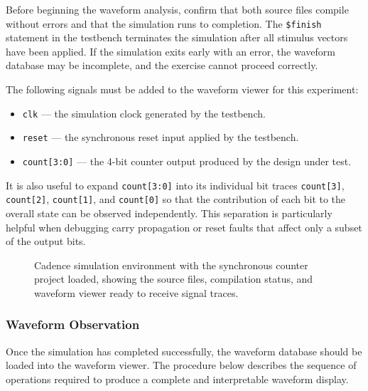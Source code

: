 Before beginning the waveform analysis, confirm that both source files compile
without errors and that the simulation runs to completion. The \texttt{\$finish}
statement in the testbench terminates the simulation after all stimulus vectors
have been applied. If the simulation exits early with an error, the waveform
database may be incomplete, and the exercise cannot proceed correctly.

The following signals must be added to the waveform viewer for this experiment:

\begin{itemize}
    \item \texttt{clk} — the simulation clock generated by the testbench.
    \item \texttt{reset} — the synchronous reset input applied by the testbench.
    \item \texttt{count[3:0]} — the 4-bit counter output produced by the design
          under test.
\end{itemize}

It is also useful to expand \texttt{count[3:0]} into its individual bit traces
\texttt{count[3]}, \texttt{count[2]}, \texttt{count[1]}, and \texttt{count[0]}
so that the contribution of each bit to the overall state can be observed
independently. This separation is particularly helpful when debugging carry
propagation or reset faults that affect only a subset of the output bits.

\begin{figure}[h]
\centering
\caption{Cadence simulation environment with the synchronous counter project
         loaded, showing the source files, compilation status, and waveform
         viewer ready to receive signal traces.}
\label{fig:sim-env}
\end{figure}

\subsubsection{Waveform Observation}
\label{sec:sim-lab-observation}

Once the simulation has completed successfully, the waveform database should be
loaded into the waveform viewer. The procedure below describes the sequence of
operations required to produce a complete and interpretable waveform display.

